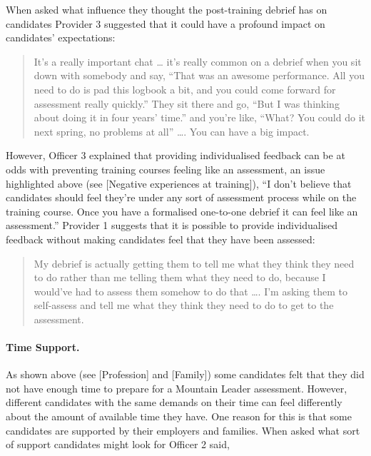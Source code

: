 \documentclass[
  12pt,
  a4paper,
]{book}
\begin{document}
When asked what influence they thought the post-training debrief has on candidates Provider 3 suggested that it could have a profound impact on candidates' expectations:

\begin{quote}
It's a really important chat \ldots{} it's really common on a debrief when you sit down with somebody and say, ``That was an awesome performance. All you need to do is pad this logbook a bit, and you could come forward for assessment really quickly.'' They sit there and go, ``But I was thinking about doing it in four years' time.'' and you're like, ``What? You could do it next spring, no problems at all'' \ldots. You can have a big impact.
\end{quote}

However, Officer 3 explained that providing individualised feedback can be at odds with preventing training courses feeling like an assessment, an issue highlighted above (see {[}Negative experiences at training{]}), ``I don't believe that candidates should feel they're under any sort of assessment process while on the training course. Once you have a formalised one-to-one debrief it can feel like an assessment.'' Provider 1 suggests that it is possible to provide individualised feedback without making candidates feel that they have been assessed:

\begin{quote}
My debrief is actually getting them to tell me what they think they need to do rather than me telling them what they need to do, because I would've had to assess them somehow to do that \ldots. I'm asking them to self-assess and tell me what they think they need to do to get to the assessment.
\end{quote}

\hypertarget{time-support.}{%
\paragraph{Time Support.}\label{time-support.}}

As shown above (see {[}Profession{]} and {[}Family{]}) some candidates felt that they did not have enough time to prepare for a Mountain Leader assessment. However, different candidates with the same demands on their time can feel differently about the amount of available time they have. One reason for this is that some candidates are supported by their employers and families. When asked what sort of support candidates might look for Officer 2 said,
\end{document}
